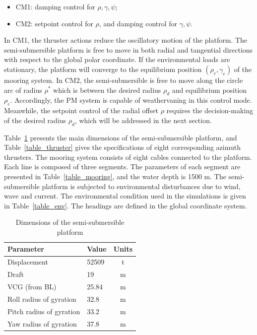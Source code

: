 \begin{sloppypar}
\begin{itemize}
	\item CM1: damping control for $\rho, \gamma, \psi$;
	\item CM2: setpoint control for $\rho$, and damping control for $\gamma, \psi$.
\end{itemize}

In CM1, the thruster actions reduce the oscillatory motion of the platform. The semi-submersible platform is free to move in both radial and tangential directions with respect to the global polar coordinate. If the environmental loads are stationary, the platform will converge to the equilibrium position $(\rho_e, \gamma_e)$ of the mooring system. In CM2, the semi-submersible is free to move along the circle arc of radius $\rho^*$ which is between the desired radius $\rho_d$ and equilibrium position $\rho_e$. Accordingly, the PM system is capable of weathervaning in this control mode. Meanwhile, the setpoint control of the radial offset $\rho$ requires the decision-making of the desired radius $\rho_d$, which will be addressed in the next section.

Table~\ref{table_dimension} presents the main dimensions of the semi-submersible platform, and Table~\ref{table_thruster} gives the specifications of eight  corresponding azimuth thrusters. The mooring system consists of eight cables connected to the platform. Each line is composed of three segments. The parameters of each segment are presented in Table~\ref{table_mooring}, and the water depth is 1500 m. The semi-submersible platform is subjected to environmental disturbances due to wind, wave and current. The environmental condition used in the simulations is given in Table~\ref{table_env}. The headings are defined in the global coordinate system.

\begin{table}[ht!]
	\caption{Dimensions of the semi-submersible platform}
	\begin{center}
		\label{table_dimension}
		\begin{tabular}{l l c}
			\hline
			Parameter & Value & Units \\
			\hline
			Displacement & 52509 & t \\
			Draft & 19 & m \\
			VCG (from BL) & 25.84 & m \\
			Roll radius of gyration & 32.8 & m \\
			Pitch radius of gyration & 33.2 & m \\
			Yaw radius of gyration & 37.8 & m \\
			\hline
		\end{tabular}
	\end{center}
\end{table}


\end{sloppypar}
